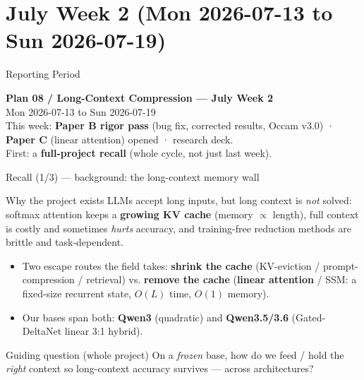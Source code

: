 
\providecommand{\pbref}[2]{\href{../../papers/paper-b-forgetting-gating/#1}{\textcolor{blue}{#2}}}
\providecommand{\pcref}[2]{\href{../../papers/paper-c-linear-attention/#1}{\textcolor{blue}{#2}}}

\section{July Week 2 (Mon 2026-07-13 to Sun 2026-07-19)}

\begin{frame}{Reporting Period}
  \begin{center}
    \textbf{Plan 08 / Long-Context Compression --- July Week 2} \\[0.3em]
    \small Mon 2026-07-13 to Sun 2026-07-19 \\
    \scriptsize This week: \textbf{Paper B rigor pass} (bug fix, corrected results, Occam v3.0) · \textbf{Paper C} (linear attention) opened · research deck. \\
    \scriptsize First: a \textbf{full-project recall} (whole cycle, not just last week).
  \end{center}
\end{frame}

\begin{frame}{Recall (1/3) --- background: the long-context memory wall}
  \small
  \begin{block}{Why the project exists}
    LLMs accept long inputs, but long context is \emph{not} solved: softmax attention keeps a \textbf{growing KV cache} (memory $\propto$ length), full context is costly and sometimes \emph{hurts} accuracy, and training-free reduction methods are brittle and task-dependent.
  \end{block}
  \begin{itemize}
    \item Two escape routes the field takes: \textbf{shrink the cache} (KV-eviction / prompt-compression / retrieval) vs. \textbf{remove the cache} (\textbf{linear attention} / SSM: a fixed-size recurrent state, $O(L)$ time, $O(1)$ memory).
    \item Our bases span both: \textbf{Qwen3} (quadratic) and \textbf{Qwen3.5/3.6} (Gated-DeltaNet linear 3:1 hybrid).
  \end{itemize}
  \begin{block}{Guiding question (whole project)}
    On a \emph{frozen} base, how do we feed / hold the \emph{right} context so long-context accuracy survives --- across architectures?
  \end{block}
\end{frame}

